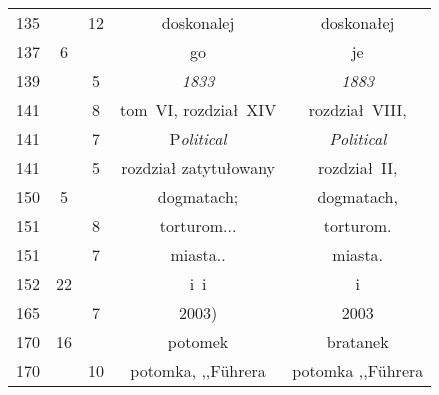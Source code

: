 \documentclass[a4paper,11pt]{article}
\begin{document}
\begin{center}
\begin{tabular}{|c|c|c|c|c|}
    135 & & 12 & doskonalej & doskonałej \\
    137 &  6 & & go & je \\
    139 & &  5 & \emph{1833} & \emph{1883} \\
    141 & &  8 & tom~VI, rozdział~XIV & rozdział~VIII, \\
    141 & &  7 & P\emph{olitical} & \emph{Political} \\
    141 & &  5 & rozdział zatytułowany & rozdział~II, \\
    150 &  5 & & dogmatach; & dogmatach, \\
    151 & &  8 & torturom... & torturom. \\
    151 & &  7 & miasta.. & miasta. \\
    152 & 22 & & i~i & i \\
    165 & &  7 & 2003) & 2003 \\
    170 & 16 & & potomek & bratanek \\
    170 & & 10 & potomka, ,,F\"{u}hrera & potomka ,,F\"{u}hrera \\
    \hline
  \end{tabular}


\end{center}
\end{document}
